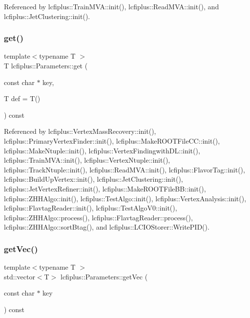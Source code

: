 Referenced by lcfiplus\+::\+Train\+M\+V\+A\+::init(), lcfiplus\+::\+Read\+M\+V\+A\+::init(), and lcfiplus\+::\+Jet\+Clustering\+::init().

\mbox{\label{classlcfiplus_1_1Parameters_aa6f8404418f133834839cfb50d2c9772}} 
\subsubsection{get()}
{\footnotesize\ttfamily template$<$typename T $>$ \\
T lcfiplus\+::\+Parameters\+::get (\begin{DoxyParamCaption}\item[{const char $\ast$}]{key,  }\item[{T}]{def = {\ttfamily T()} }\end{DoxyParamCaption}) const\hspace{0.3cm}{\ttfamily [inline]}}



Referenced by lcfiplus\+::\+Vertex\+Mass\+Recovery\+::init(), lcfiplus\+::\+Primary\+Vertex\+Finder\+::init(), lcfiplus\+::\+Make\+R\+O\+O\+T\+File\+C\+C\+::init(), lcfiplus\+::\+Make\+Ntuple\+::init(), lcfiplus\+::\+Vertex\+Findingwith\+D\+L\+::init(), lcfiplus\+::\+Train\+M\+V\+A\+::init(), lcfiplus\+::\+Vertex\+Ntuple\+::init(), lcfiplus\+::\+Track\+Ntuple\+::init(), lcfiplus\+::\+Read\+M\+V\+A\+::init(), lcfiplus\+::\+Flavor\+Tag\+::init(), lcfiplus\+::\+Build\+Up\+Vertex\+::init(), lcfiplus\+::\+Jet\+Clustering\+::init(), lcfiplus\+::\+Jet\+Vertex\+Refiner\+::init(), lcfiplus\+::\+Make\+R\+O\+O\+T\+File\+B\+B\+::init(), lcfiplus\+::\+Z\+H\+H\+Algo\+::init(), lcfiplus\+::\+Test\+Algo\+::init(), lcfiplus\+::\+Vertex\+Analysis\+::init(), lcfiplus\+::\+Flavtag\+Reader\+::init(), lcfiplus\+::\+Test\+Algo\+V0\+::init(), lcfiplus\+::\+Z\+H\+H\+Algo\+::process(), lcfiplus\+::\+Flavtag\+Reader\+::process(), lcfiplus\+::\+Z\+H\+H\+Algo\+::sort\+Btag(), and lcfiplus\+::\+L\+C\+I\+O\+Storer\+::\+Write\+P\+I\+D().

\mbox{\label{classlcfiplus_1_1Parameters_a6c484849393b5b8b844d9b34956b8c2c}} 
\subsubsection{get\+Vec()}
{\footnotesize\ttfamily template$<$typename T $>$ \\
std\+::vector$<$T$>$ lcfiplus\+::\+Parameters\+::get\+Vec (\begin{DoxyParamCaption}\item[{const char $\ast$}]{key }\end{DoxyParamCaption}) const\hspace{0.3cm}{\ttfamily [inline]}}

